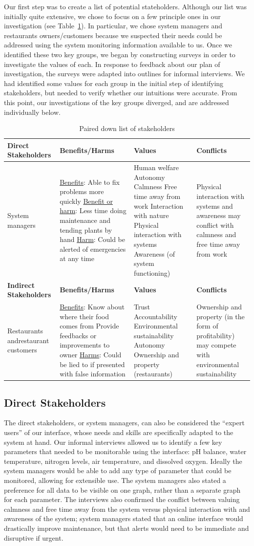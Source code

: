 \documentclass{sigchi}
\newcommand\tabhead[1]{\small\textbf{#1}}
\newcommand{\stakeholdertable}{
\begin{table}
  \centering
  	\begin{tabularx}{0.9\textwidth}{|X|X|X|X|}
    \hline
    \tabhead{Direct Stakeholders} & \tabhead{Benefits/Harms} & \tabhead{Values} & \tabhead{Conflicts} \\
    \hline
    System managers & 
		\underline{Benefits}: Able to fix problems more quickly\newline
		\underline{Benefit or harm}: Less time doing maintenance and tending plants by hand\newline
		\underline{Harm}: Could be alerted of emergencies at any time
	&	Human welfare\newline
	 	Autonomy\newline
		Calmness\newline
		Free time away from work\newline
		Interaction with nature\newline
		Physical interaction with systems\newline
		Awareness (of system functioning)
	& Physical interaction with systems and awareness may conflict with calmness and free time away from work \\
    \hline
    \tabhead{Indirect Stakeholders} & \tabhead{Benefits/Harms} & \tabhead{Values} & \tabhead{Conflicts} \\
    \hline
    Restaurants and\newline restaurant customers &
		\underline{Benefits}: Know about where their food comes from\newline
		Provide feedbacks or improvements to owner\newline
		\underline{Harms}: Could be lied to if presented with false information
	&	Trust\newline
		Accountability\newline
		Environmental sustainability\newline
		Autonomy\newline
		Ownership and property (restaurants)
	&	Ownership and property (in the form of profitability) may compete with environmental sustainability\\
    \hline
  \end{tabularx}
  \caption{Paired down list of stakeholders}
  \label{tab:stakeholders}
\end{table}}
\begin{document}
Our first step was to create a list of potential stateholders. Although our list was initially quite extensive, we chose to focus on a few principle ones in our investigation (see Table~\ref{tab:stakeholders}). In particular, we chose system managers and restaurants owners/customers because we suspected their needs could be addressed using the system monitoring information available to us. Once we identified these two key groups, we began by constructing surveys in order to investigate the values of each. In response to feedback about our plan of investigation, the surveys were adapted into outlines for informal interviews. We had identified some values for each group in the initial step of identifying stakeholders, but needed to verify whether our intuitions were accurate. From this point, our investigations of the key groups diverged, and are addressed individually below. 
\stakeholdertable

\subsection{Direct Stakeholders}

The direct stakeholders, or system managers, can also be considered the ``expert users'' of our interface, whose needs and skills are specifically adapted to the system at hand. Our informal interviews allowed us to identify a few key parameters that needed to be monitorable using the interface: pH balance, water temperature, nitrogen levels, air temperature, and dissolved oxygen. Ideally the system managers would be able to add any type of parameter that could be monitored, allowing for extensible use. The system managers also stated a preference for all data to be visible on one graph, rather than a separate graph for each parameter. The interviews also confirmed the conflict between valuing calmness and free time away from the system versus physical interaction with and awareness of the system; system managers stated that an online interface would drastically improve maintenance, but that alerts would need to be immediate and disruptive if urgent. 
\end{document}

